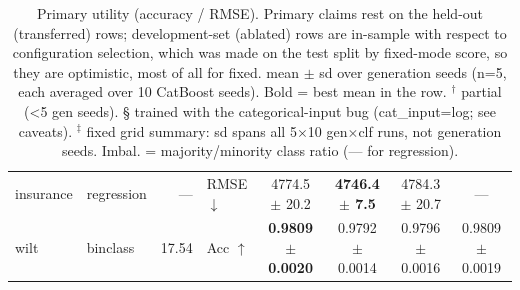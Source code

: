 \begin{table}[t]
\begin{tabular}{llrlcccc}
insurance & regression & — & RMSE $\downarrow$ & 4774.5 $\pm$ 20.2 & \textbf{4746.4 $\pm$ 7.5} & 4784.3 $\pm$ 20.7 & --- \\
wilt & binclass & 17.54 & Acc $\uparrow$ & \textbf{0.9809 $\pm$ 0.0020} & 0.9792 $\pm$ 0.0014 & 0.9796 $\pm$ 0.0016 & 0.9809 $\pm$ 0.0019 \\
\bottomrule
\end{tabular}
\caption{Primary utility (accuracy / RMSE). Primary claims rest on the held-out (transferred) rows; development-set (ablated) rows are in-sample with respect to configuration selection, which was made on the test split by fixed-mode score, so they are optimistic, most of all for fixed. mean $\pm$ sd over generation seeds (n=5, each averaged over 10 CatBoost seeds). Bold = best mean in the row. $^\dagger$ partial (<5 gen seeds). § trained with the categorical-input bug (cat_input=log; see caveats). $^\ddagger$ fixed grid summary: sd spans all 5$\times$10 gen$\times$clf runs, not generation seeds. Imbal. = majority/minority class ratio (— for regression).}
\end{table}
